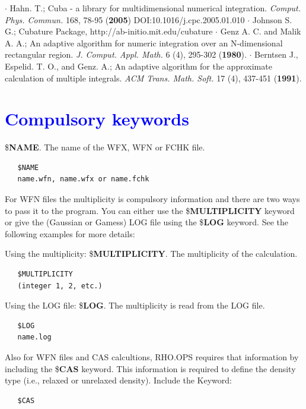 \documentclass[10pt,a4paper]{article}
\newcommand{\tbl}[1]{{\textcolor{blue}{#1}}}
\begin{document}
\noindent $\cdot$ Hahn. T.; Cuba - a library for multidimensional numerical integration. \textit{Comput. Phys. Commun.} 168, 78-95 (\textbf{2005}) DOI:10.1016/j.cpc.2005.01.010\newline
\noindent $\cdot$ Johnson S. G.; Cubature Package, http://ab-initio.mit.edu/cubature \newline
\noindent $\cdot$ Genz A. C. and Malik A. A.; An adaptive algorithm for numeric integration over an N-dimensional rectangular region. \textit{J. Comput. Appl. Math.} 6 (4), 295-302 (\textbf{1980}).\newline
\noindent $\cdot$ Berntsen J., Espelid. T. O., and Genz. A.; An adaptive algorithm for the approximate calculation of multiple integrals. \textit{ACM Trans. Math. Soft.} 17 (4), 437-451 (\textbf{1991}).\newline

\section{\tbl{\textbf{Compulsory keywords}}}

\noindent\$\textbf{NAME}. The name of the WFX, WFN or FCHK file.

\begin{verbatim}
   $NAME
   name.wfn, name.wfx or name.fchk
\end{verbatim}

\noindent For WFN files the multiplicity is compulsory information and there are two ways to pass it to the program. You can either use the \$\textbf{MULTIPLICITY} keyword or give the (Gaussian or Gamess) LOG file using the \$\textbf{LOG} keyword. See the following examples for more details: \newline

\noindent Using the multiplicity: \newline
\noindent \$\textbf{MULTIPLICITY}. The multiplicity of the calculation.

\begin{verbatim}
   $MULTIPLICITY
   (integer 1, 2, etc.)
\end{verbatim}

\noindent Using the LOG file: \newline
\noindent \$\textbf{LOG}. The multiplicity is read from the LOG file.

\begin{verbatim}
   $LOG
   name.log
\end{verbatim}

\noindent Also for WFN files and CAS calcultions, RHO.OPS requires that information by including the \$\textbf{CAS} keyword. This information is required to define the density type (i.e., relaxed or unrelaxed density). Include the Keyword:\newline
\begin{verbatim}
   $CAS
\end{verbatim}
\end{document}

